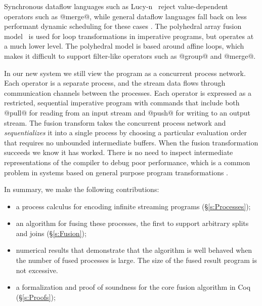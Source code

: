 
Synchronous dataflow languages such as Lucy-n~\cite{mandel2010lucy} reject value-dependent operators such as @merge@, while general dataflow languages fall back on less performant dynamic scheduling for these cases \cite{bouakaz2013real}. The polyhedral array fusion model~\cite{feautrier2011polyhedron} is used for loop transformations in imperative programs, but operates at a much lower level. The polyhedral model is based around affine loops, which makes it difficult to support filter-like operators such as @group@ and @merge@.

In our new system we still view the program as a concurrent process network. Each operator is a separate process, and the stream data flows through communication channels between the processes. Each operator is expressed as a restricted, sequential imperative program with commands that include both @pull@ for reading from an input stream and @push@ for writing to an output stream. The fusion transform takes the concurrent process network and \emph{sequentializes} it into a single process by choosing a particular evaluation order that requires no unbounded intermediate buffers. When the fusion transformation succeeds we know it has worked. There is no need to inspect intermediate representations of the compiler to debug poor performance, which is a common problem in systems based on general purpose program transformations \cite{lippmeier2012:guiding}.

In summary, we make the following contributions:
\begin{itemize}
\item a process calculus for encoding infinite streaming programs (\S\ref{s:Processes});
\item an algorithm for fusing these processes, the first to support arbitrary splits and joins (\S\ref{s:Fusion});
\item numerical results that demonstrate that the algorithm is well behaved when the number of fused processes is large. The size of the fused result program is not excessive. 
\item a formalization and proof of soundness for the core fusion algorithm in Coq (\S\ref{s:Proofs});
\end{itemize}


